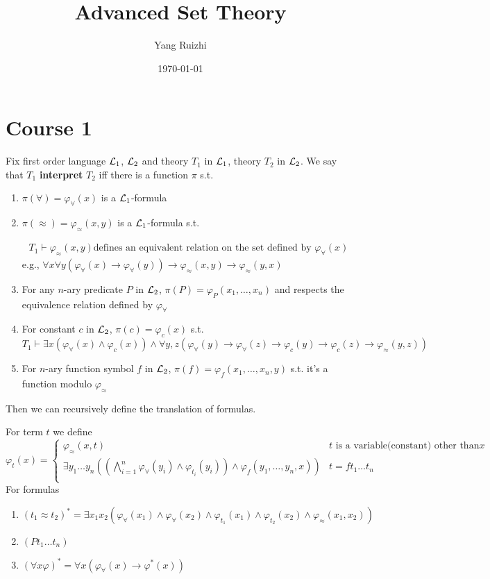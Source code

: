 \documentclass[11pt]{article}
\author{Yang Ruizhi}
\date{\today}
\title{Advanced Set Theory}
\begin{document}
\maketitle
\tableofcontents


\section{Course 1}
\label{sec:org596ee23}
\begin{definition}[]
Fix first order language \(\mathcal{L}_1\), \(\mathcal{L}_2\) and theory \(T_1\) in \(\mathcal{L}_1\), theory \(T_2\) in \(\mathcal{L}_2\). We
say that \(T_1\) \textbf{interpret} \(T_2\) iff there is a function \(\pi\) s.t.
\begin{enumerate}
\item \(\pi(\forall)=\varphi_{\forall}(x)\) is a \(\mathcal{L}_1\)-formula
\item \(\pi(\approx)=\varphi_{\approx}(x,y)\) is a \(\mathcal{L}_1\)-formula s.t.

\begin{align*}
T_1\vdash\varphi_\approx(x,y)\text{defines an equivalent relation on the set defined by }\varphi_\forall(x)
\end{align*}
e.g., \(\forall x\forall y(\varphi_\forall(x)\to\varphi_\forall(y))\to\varphi_\approx(x,y)\to\varphi_\approx(y,x)\)
\item For any \(n\)-ary predicate \(P\) in \(\mathcal{L}_2\), \(\pi(P)=\varphi_P(x_1,\dots,x_n)\) and respects the
equivalence relation defined by \(\varphi_\forall\)
\item For constant \(c\) in \(\mathcal{L}_2\), \(\pi(c)=\varphi_c(x)\) s.t.
\(T_1\vdash\exists x(\varphi_\forall(x)\wedge\varphi_c(x))\wedge\forall y,z(\varphi_\forall(y)\to\varphi_\forall(z)\to\varphi_c(y)\to\varphi_c(z)\to\varphi_\approx(y,z))\)
\item For \(n\)-ary function symbol \(f\) in \(\mathcal{L}_2\), \(\pi(f)=\varphi_f(x_1,\dots,x_n,y)\) s.t. it's a function
modulo \(\varphi_\approx\)
\end{enumerate}


Then we can recursively define the translation of formulas.

For term \(t\) we define
\begin{equation*}
\varphi_t(x)=
\begin{cases}
\varphi_\approx(x,t)&t\text{ is a variable(constant) other than }x\\
\exists y_1\dots y_n((\bigwedge_{i=1}^n\varphi_\forall(y_i)\wedge\varphi_{t_i}(y_i))\wedge\varphi_f(y_1,\dots,y_n,x))&t=ft_1\dots t_n\\
\end{cases}
\end{equation*}
For formulas
\begin{enumerate}
\item \((t_1\approx t_2)^*=\exists x_1x_2(\varphi_\forall(x_1)\wedge\varphi_\forall(x_2)\wedge\varphi_{t_1}(x_1)\wedge\varphi_{t_2}(x_2)\wedge\varphi_\approx(x_1,x_2))\)
\item \((Pt_1\dots t_n)\)
\item \((\forall x\varphi)^*=\forall x(\varphi_\forall(x)\to\varphi^*(x))\)
\end{enumerate}


\end{definition}
\end{document}
